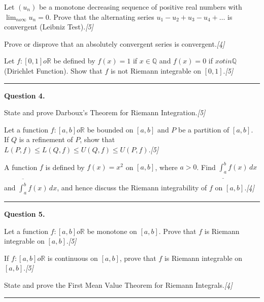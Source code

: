 \documentclass[11pt,a4paper]{article}
\newcommand{\pts}[1]{\hfill   \textit{[#1]}}
\begin{document}
{\begin{parts}
  \item Let $(u_n)$ be a monotone decreasing sequence of positive real numbers with $\lim_{n  o \infty} u_n = 0$. Prove that the alternating series $u_1 - u_2 + u_3 - u_4 + \dots$ is convergent (Leibniz Test).\pts{5}
  \item Prove or disprove that an absolutely convergent series is convergent.\pts{4}
  \item Let $f \colon [0, 1]  o \mathbb{R}$ be defined by $f(x) = 1$ if $x \in \mathbb{Q}$ and $f(x) = 0$ if $x 
otin \mathbb{Q}$ (Dirichlet Function). Show that $f$ is not Riemann integrable on $[0, 1]$.\pts{5}
\end{parts}

\medskip\rule{\linewidth}{0.2pt}\medskip




\noindent   \textbf{Question 4.}

\begin{parts}
  \item State and prove Darboux's Theorem for Riemann Integration.\pts{5}
  \item Let a function $f \colon [a, b]  o \mathbb{R}$ be bounded on $[a, b]$ and $P$ be a partition of $[a, b]$. If $Q$ is a refinement of $P$, show that $L(P, f) \le L(Q, f) \le U(Q, f) \le U(P, f)$.\pts{5}
  \item A function $f$ is defined by $f(x) = x^2$ on $[a, b]$, where $a > 0$. Find $\underline{\int_a^b} f(x) \, dx$ and $\overline{\int_a^b} f(x) \, dx$, and hence discuss the Riemann integrability of $f$ on $[a, b]$.\pts{4}
\end{parts}

\medskip\rule{\linewidth}{0.2pt}\medskip




\noindent   \textbf{Question 5.}

\begin{parts}
  \item Let a function $f \colon [a, b]  o \mathbb{R}$ be monotone on $[a, b]$. Prove that $f$ is Riemann integrable on $[a, b]$.\pts{5}
  \item If $f \colon [a, b]  o \mathbb{R}$ is continuous on $[a, b]$, prove that $f$ is Riemann integrable on $[a, b]$.\pts{5}
  \item State and prove the First Mean Value Theorem for Riemann Integrals.\pts{4}
\end{parts}

\medskip\rule{\linewidth}{0.2pt}\medskip




}
\end{document}
